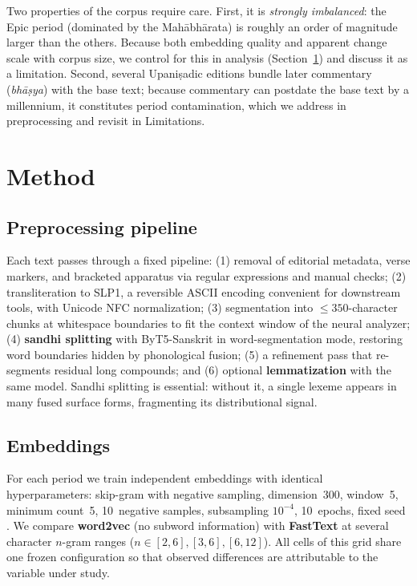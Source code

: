 \documentclass[11pt]{article}
\begin{document}
Two properties of the corpus require care. First, it is \emph{strongly imbalanced}: the Epic period (dominated by the Mah\=abh\=arata) is roughly an order of magnitude larger than the others. Because both embedding quality and apparent change scale with corpus size, we control for this in analysis (Section~\ref{sec:method}) and discuss it as a limitation. Second, several Upani\d{s}adic editions bundle later commentary (\textit{bh\=a\d{s}ya}) with the base text; because commentary can postdate the base text by a millennium, it constitutes period contamination, which we address in preprocessing and revisit in Limitations.

\section{Method}
\label{sec:method}

\subsection{Preprocessing pipeline}
Each text passes through a fixed pipeline: (1) removal of editorial metadata, verse markers, and bracketed apparatus via regular expressions and manual checks; (2) transliteration to SLP1, a reversible ASCII encoding convenient for downstream tools, with Unicode NFC normalization; (3) segmentation into ${\le}350$-character chunks at whitespace boundaries to fit the context window of the neural analyzer; (4) \textbf{sandhi splitting} with ByT5-Sanskrit \citep{nehrdich2024byt5} in word-segmentation mode, restoring word boundaries hidden by phonological fusion; (5) a refinement pass that re-segments residual long compounds; and (6) optional \textbf{lemmatization} with the same model. Sandhi splitting is essential: without it, a single lexeme appears in many fused surface forms, fragmenting its distributional signal.

\subsection{Embeddings}
For each period we train independent embeddings with identical hyperparameters: skip-gram with negative sampling, dimension~300, window~5, minimum count~5, 10~negative samples, subsampling $10^{-4}$, 10~epochs, fixed seed \citep{mikolov2013distributed, rehurek2010gensim}. We compare \textbf{word2vec} (no subword information) with \textbf{FastText} \citep{bojanowski2017enriching} at several character $n$-gram ranges ($n\!\in\![2,6],[3,6],[6,12]$). All cells of this grid share one frozen configuration so that observed differences are attributable to the variable under study.
\end{document}
